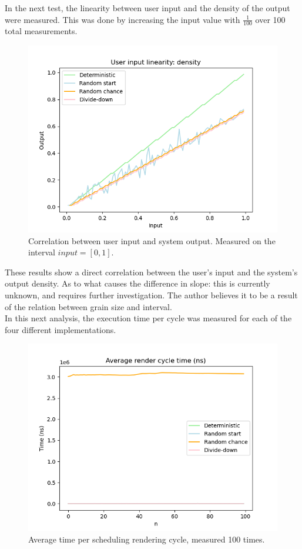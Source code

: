 \documentclass[10pt, twocolumn]{IEEEtran}
\begin{document}
In the next test, the linearity between user input and the density of the output were measured. This was done by increasing the input value with $ \frac{1}{100} $ over 100 total measurements.
\begin{figure}[ht!]
	\includegraphics[width=\linewidth]{scd_linearity.png}
	\caption{Correlation between user input and system output. Measured on the interval $ \textit{input} =[0,1] $.}
	\label{fig:scd_linearity}
\end{figure}

These results show a direct correlation between the user's input and the system's output density. As to what causes the difference in slope: this is currently unknown, and requires further investigation. The author believes it to be a result of the relation between grain size and interval.\\

In this next analysis, the execution time per cycle was measured for each of the four different implementations.
\begin{figure}[ht!]
\includegraphics[width=\linewidth]{scd_cycle_time.png}
\caption{Average time per scheduling rendering cycle, measured 100 times.}
\label{fig:scd_cycle_time}
\end{figure}
\end{document}
